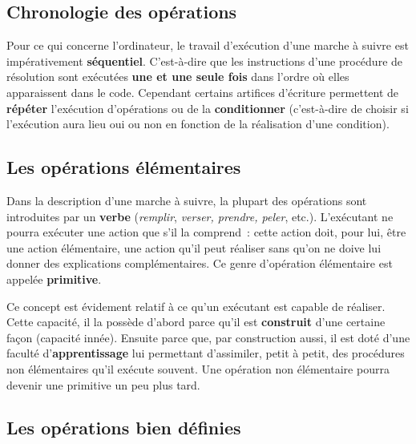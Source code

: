 	\subsection{Chronologie des opérations}

		Pour ce qui concerne l’ordinateur, le travail d’exécution d’une marche à
		suivre est impérativement \textbf{séquentiel}. C’est-à-dire que les
		instructions d’une procédure de résolution sont exécutées \textbf{une
		et une seule fois} dans l’ordre où elles apparaissent dans le code.
		Cependant certains artifices d’écriture permettent de \textbf{répéter}
		l’exécution d’opérations ou de la \textbf{conditionner}
		(c’est-à-dire de choisir si
		l’exécution aura lieu oui ou non en fonction de la
		réalisation d’une condition).

	\subsection{Les opérations élémentaires}


		Dans la description d’une marche à suivre, la plupart des opérations
		sont introduites par un \textbf{verbe
		}(\textit{remplir}, \textit{verser, prendre, peler},
		etc.). L’exécutant ne pourra exécuter une action que s’il la comprend~:
		cette action doit, pour lui, être une action élémentaire, une action
		qu’il peut réaliser sans qu’on ne doive lui donner des explications
		complémentaires. Ce genre d’opération élémentaire est appelée
		\textbf{primitive}.
		
		Ce concept est évidement relatif à ce qu’un exécutant est capable de
		réaliser. Cette capacité, il la possède d’abord parce qu’il est
		\textbf{construit} d’une certaine façon (capacité innée). Ensuite parce
		que, par construction aussi, il est doté d’une faculté
		d’\textbf{apprentissage} lui permettant d’assimiler, petit à petit, des
		procédures non élémentaires qu’il exécute souvent. Une opération non
		élémentaire pourra devenir une primitive un peu plus tard.
		

	\subsection{Les opérations bien définies}

